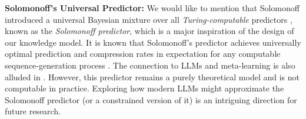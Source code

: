 \documentclass[11pt]{article}
\theoremstyle{plain}
\theoremstyle{definition}
\newcommand{\jian}[1]{{\it \color{red}{Jian: #1}}}
\begin{document}
\vspace{0.1cm}
\noindent
{\bf Solomonoff's Universal Predictor:}
We would like to mention that Solomonoff introduced a universal Bayesian mixture over all \emph{Turing-computable} predictors \citep{Solomonoff1964a,Solomonoff1964b}, known as the \emph{Solomonoff predictor},
which is a major inspiration of the design of our knowledge model.
It is known that Solomonoff's predictor
achieves universally optimal prediction and compression rates in expectation for any computable sequence-generation process \citep{RathmannerHutter2011}. 
The connection to LLMs and meta-learning is also alluded in 
\citep{deletanglanguage, graulearning}.
However, this predictor remains a purely theoretical model and is not computable in practice. Exploring how modern LLMs might approximate the Solomonoff predictor (or a constrained version of it) is an intriguing direction for future research.







\end{document}
